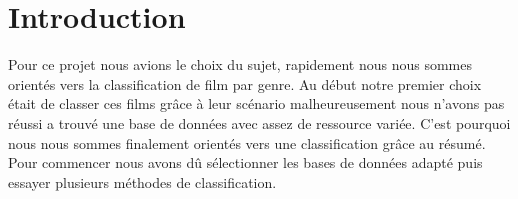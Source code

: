 \section{Introduction}
Pour ce projet nous avions le choix du sujet, rapidement nous nous sommes orientés vers la classification de film par genre.
Au début notre premier choix était de classer ces films grâce à leur scénario malheureusement nous n’avons pas réussi a trouvé une base de données avec assez de ressource variée. C’est pourquoi nous nous sommes finalement orientés vers une classification grâce au résumé.
\\

Pour commencer nous avons dû sélectionner les bases de données adapté puis essayer plusieurs méthodes de classification.
